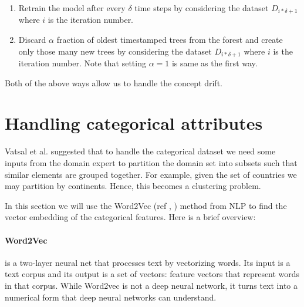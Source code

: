 \begin{enumerate}
    \item Retrain the model after every $\delta$ time steps by considering the dataset $D_{i * \delta + 1}$ where $i$ is the iteration number.
    \item Discard $\alpha$ fraction of oldest timestamped trees from the forest and create only those many new trees by considering the dataset $D_{i * \delta + 1}$ where $i$ is the iteration number. Note that setting $\alpha = 1$ is same as the first way.
\end{enumerate}

Both of the above ways allow us to handle the concept drift. 

\pagebreak


\section{Handling categorical attributes}
\label{sec:handling-categorical-attributes}

Vatsal et al. \cite{NIPS2019_9710} suggested that to handle the categorical dataset we need some inputs from the domain expert to partition the domain set into subsets such that similar elements are grouped together. For example, given the set of countries we may partition by continents. Hence, this becomes a clustering problem.

In this section we will use the Word2Vec (ref \cite{41224}, \cite{NIPS2013_5021}) method from NLP to find the vector embedding of the categorical features. Here is a brief overview:

\paragraph{Word2Vec} is a two-layer neural net that processes text by vectorizing words. Its input is a text corpus and its output is a set of vectors: feature vectors that represent words in that corpus. While Word2vec is not a deep neural network, it turns text into a numerical form that deep neural networks can understand.

